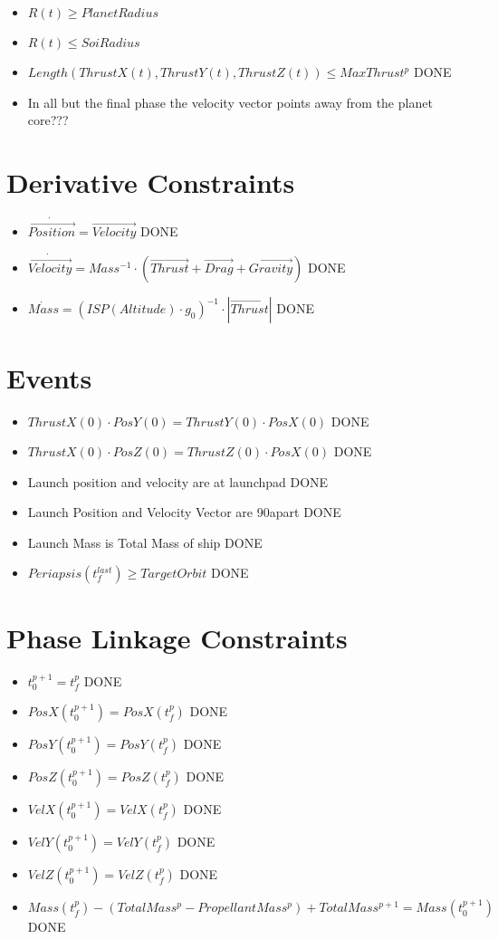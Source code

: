 \documentclass[11pt]{report}
\newcommand{\DONE}{{DONE}}
\begin{document}
\begin{itemize}
\item $R(t) \geq PlanetRadius$
\item $R(t) \leq SoiRadius$
\item $Length(ThrustX(t), ThrustY(t), ThrustZ(t)) \leq MaxThrust^p$ \DONE
\item In all but the final phase the velocity vector points away from the planet core???
\end{itemize}

\section{Derivative Constraints}

\begin{itemize}
\item $\dot{\overrightarrow{Position}} = \overrightarrow{Velocity}$ \DONE
\item $\dot{\overrightarrow{Velocity}} = Mass^{-1}\cdot\left(\overrightarrow{Thrust} + \overrightarrow{Drag} + \overrightarrow{Gravity}\right)$ \DONE
\item $\dot{Mass} = (ISP(Altitude) \cdot g_0)^{-1}\cdot\left|\overrightarrow{Thrust}\right|$ \DONE
\end{itemize}
\section{Events}

\begin{itemize}
\item $ThrustX(0) \cdot PosY(0) = ThrustY(0) \cdot PosX(0)$ \DONE
\item $ThrustX(0) \cdot PosZ(0) = ThrustZ(0) \cdot PosX(0)$ \DONE
\item Launch position and velocity are at launchpad \DONE
\item Launch Position and Velocity Vector are 90\textdegree apart \DONE
\item Launch Mass is Total Mass of ship \DONE
\item $Periapsis(t_f^{last}) \geq TargetOrbit$ \DONE
\end{itemize}

\section{Phase Linkage Constraints}

\begin{itemize}
\item $t_0^{p+1} = t_f^p$ \DONE
\item $PosX(t_0^{p+1}) = PosX(t_f^p)$ \DONE
\item $PosY(t_0^{p+1}) = PosY(t_f^p)$ \DONE
\item $PosZ(t_0^{p+1}) = PosZ(t_f^p)$ \DONE
\item $VelX(t_0^{p+1}) = VelX(t_f^p)$ \DONE
\item $VelY(t_0^{p+1}) = VelY(t_f^p)$ \DONE
\item $VelZ(t_0^{p+1}) = VelZ(t_f^p)$ \DONE
\item $Mass(t_f^p) - (TotalMass^p - PropellantMass^p) + TotalMass^{p+1} = Mass(t_0^{p+1})$ \DONE
\end{itemize}
\end{document}
